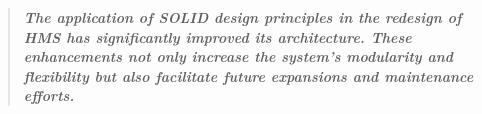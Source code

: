 \documentclass[12pt]{article}
\begin{document}
\begin{quote}
    \textbf{\textit{The application of SOLID design principles in the redesign of HMS has significantly improved its architecture. These enhancements not only increase the system's modularity and flexibility but also facilitate future expansions and maintenance efforts.}}
    \end{quote}
    
\end{document}
